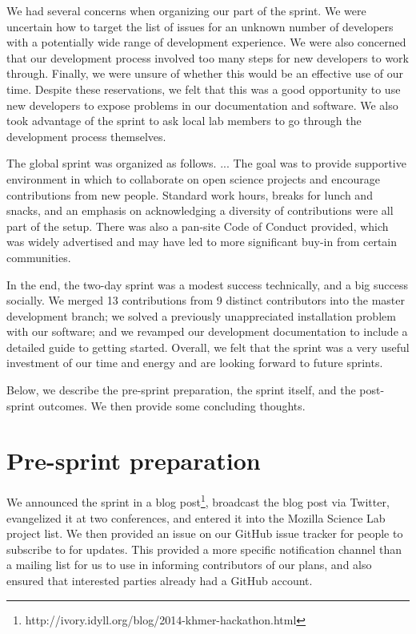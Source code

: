 \documentclass[12pt]{article}
\begin{document}
We had several concerns when organizing our part of the sprint.  We
were uncertain how to target the list of issues for an unknown number
of developers with a potentially wide range of development experience.
We were also concerned that our development process involved too many
steps for new developers to work through.  Finally, we were unsure of
whether this would be an effective use of our time.  Despite these
reservations, we felt that this was a good opportunity to use new
developers to expose problems in our documentation and software.  We
also took advantage of the sprint to ask local lab members to go
through the development process themselves.

The global sprint was organized as follows. ... The goal was to provide
supportive environment in which to collaborate on open science projects
and encourage contributions from new people.  Standard work hours,
breaks for lunch and snacks, and an emphasis on acknowledging a diversity
of contributions were all part of the setup.  There was also a pan-site
Code of Conduct provided, which was widely advertised and may have led
to more significant buy-in from certain communities.

In the end, the two-day sprint was a modest success technically, and a
big success socially. We merged 13 contributions from 9 distinct
contributors into the master development branch; we solved a
previously unappreciated installation problem with our software; and
we revamped our development documentation to include a detailed guide
to getting started.  Overall, we felt that the sprint was a very
useful investment of our time and energy and are looking forward to
future sprints.

Below, we describe the pre-sprint preparation, the sprint itself, and the
post-sprint outcomes.  We then provide some concluding thoughts.




\section{Pre-sprint preparation}

We announced the sprint in a blog
post\footnote{http://ivory.idyll.org/blog/2014-khmer-hackathon.html},
broadcast the blog post via Twitter, evangelized it at two
conferences, and entered it into the Mozilla Science Lab project list.
We then provided an issue on our GitHub issue tracker for people to
subscribe to for updates.  This provided a more specific
notification channel than a mailing list for us to use in informing
contributors of our plans, and also ensured that interested parties
already had a GitHub account.
\end{document}
